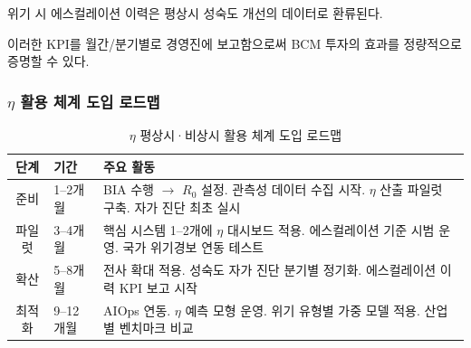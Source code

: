 위기 시 에스컬레이션 이력은 평상시 성숙도 개선의 데이터로 환류된다.

이러한 KPI를 월간/분기별로 경영진에 보고함으로써
BCM 투자의 효과를 정량적으로 증명할 수 있다.


\subsubsection{$\eta$  활용 체계 도입 로드맵}
\label{app:eta-roadmap}


\begin{table}[htbp]
\centering
\caption{$\eta$ 평상시·비상시 활용 체계 도입 로드맵}
\label{tab:app-roadmap}
\small
\begin{tabularx}{\textwidth}{c l X}
\toprule
\textbf{단계} & \textbf{기간} & \textbf{주요 활동} \\
\midrule
준비 & 1--2개월 &
  BIA 수행 $\to$ $R_0$ 설정. 관측성 데이터 수집 시작.
  $\eta$ 산출 파일럿 구축. 자가 진단 최초 실시 \\
\addlinespace
파일럿 & 3--4개월 &
  핵심 시스템 1--2개에 $\eta$ 대시보드 적용.
  에스컬레이션 기준 시범 운영. 국가 위기경보 연동 테스트 \\
\addlinespace
확산 & 5--8개월 &
  전사 확대 적용. 성숙도 자가 진단 분기별 정기화.
  에스컬레이션 이력 KPI 보고 시작 \\
\addlinespace
최적화 & 9--12개월 &
  AIOps 연동. $\eta$ 예측 모형 운영.
  위기 유형별 가중 모델 적용. 산업별 벤치마크 비교 \\
\bottomrule
\end{tabularx}
\end{table}


